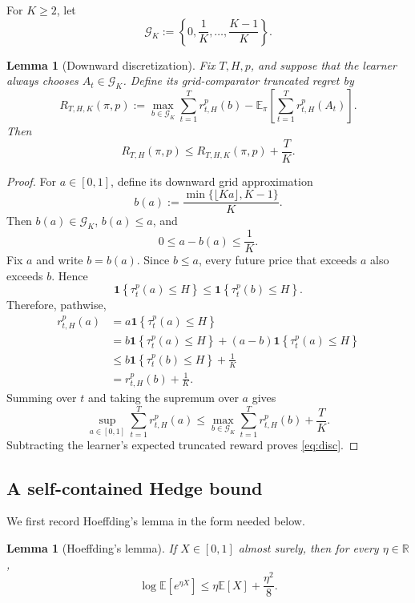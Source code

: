 \documentclass[11pt]{article}
\newtheorem{lemma}[theorem]{Lemma}
\theoremstyle{remark}
\newcommand{\ind}[1]{\mathbf{1}\!\left\{#1\right\}}
\newcommand{\E}{\mathbb{E}}
\newcommand{\R}{\mathbb{R}}
\newcommand{\G}{\mathcal{G}}
\newcommand{\Tau}{\tau}
\begin{document}
For $K\ge2$, let
\begin{equation}\label{eq:grid}
    \G_K
    :=
    \left\{0,\frac1K,\ldots,\frac{K-1}{K}\right\}.
\end{equation}

\begin{lemma}[Downward discretization]\label{lem:discretization}
Fix $T,H,p$, and suppose that the learner always chooses $A_t\in\G_K$.  Define
its grid-comparator truncated regret by
\[
    R_{T,H,K}(\pi,p)
    :=
    \max_{b\in\G_K}
    \sum_{t=1}^T r_{t,H}^p(b)
    -
    \E_\pi\!\left[\sum_{t=1}^T r_{t,H}^p(A_t)\right].
\]
Then
\begin{equation}\label{eq:disc}
    R_{T,H}(\pi,p)
    \le
    R_{T,H,K}(\pi,p)+\frac{T}{K}.
\end{equation}
\end{lemma}

\begin{proof}
For $a\in[0,1]$, define its downward grid approximation
\[
    b(a)
    :=
    \frac{\min\{\lfloor Ka\rfloor,K-1\}}{K}.
\]
Then $b(a)\in\G_K$, $b(a)\le a$, and
\[
    0\le a-b(a)\le\frac1K.
\]
Fix $a$ and write $b=b(a)$.  Since $b\le a$, every future price that exceeds
$a$ also exceeds $b$.  Hence
\[
    \ind{\Tau_t^p(a)\le H}
    \le
    \ind{\Tau_t^p(b)\le H}.
\]
Therefore, pathwise,
\begin{align*}
    r_{t,H}^p(a)
    &=a\ind{\Tau_t^p(a)\le H}\\
    &=b\ind{\Tau_t^p(a)\le H}
      +(a-b)\ind{\Tau_t^p(a)\le H}\\
    &\le b\ind{\Tau_t^p(b)\le H}+\frac1K\\
    &=r_{t,H}^p(b)+\frac1K.
\end{align*}
Summing over $t$ and taking the supremum over $a$ gives
\[
    \sup_{a\in[0,1]}\sum_{t=1}^T r_{t,H}^p(a)
    \le
    \max_{b\in\G_K}\sum_{t=1}^T r_{t,H}^p(b)
    +\frac{T}{K}.
\]
Subtracting the learner's expected truncated reward proves \eqref{eq:disc}.
\end{proof}

\subsection{A self-contained Hedge bound}

We first record Hoeffding's lemma in the form needed below.

\begin{lemma}[Hoeffding's lemma]\label{lem:hoeffding}
If $X\in[0,1]$ almost surely, then for every $\eta\in\R$,
\[
    \log\E[e^{\eta X}]
    \le
    \eta\E[X]+\frac{\eta^2}{8}.
\]
\end{lemma}
\end{document}
